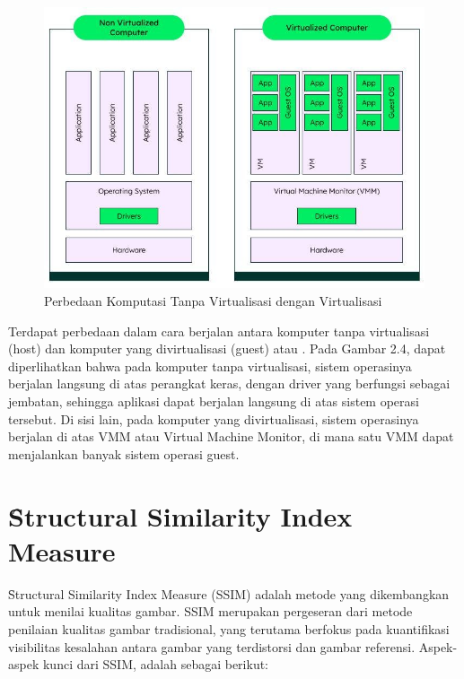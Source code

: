 \begin{figure}
	\centering
	\includegraphics[width=1\textwidth]
	{assets/pics/vm-diagram.jpg}
	\caption{Perbedaan Komputasi Tanpa Virtualisasi dengan Virtualisasi}
	\label{fig:vm-diagram}
\end{figure}

Terdapat perbedaan dalam cara berjalan antara komputer tanpa virtualisasi (host) dan komputer yang divirtualisasi (guest) atau \vm. Pada Gambar 2.4, dapat diperlihatkan bahwa pada komputer tanpa virtualisasi, sistem operasinya berjalan langsung di atas perangkat keras, dengan driver yang berfungsi sebagai jembatan, sehingga aplikasi dapat berjalan langsung di atas sistem operasi tersebut. Di sisi lain, pada komputer yang divirtualisasi, sistem operasinya berjalan di atas VMM atau Virtual Machine Monitor, di mana satu VMM dapat menjalankan banyak sistem operasi guest.

\section{\f{Structural Similarity Index Measure}}
\f{Structural Similarity Index Measure} (SSIM) adalah metode yang dikembangkan untuk menilai kualitas gambar. SSIM merupakan pergeseran dari metode penilaian kualitas gambar tradisional, yang terutama berfokus pada kuantifikasi visibilitas kesalahan antara gambar yang terdistorsi dan gambar referensi\cite{Wang2004}. Aspek-aspek kunci dari SSIM, adalah sebagai berikut:

